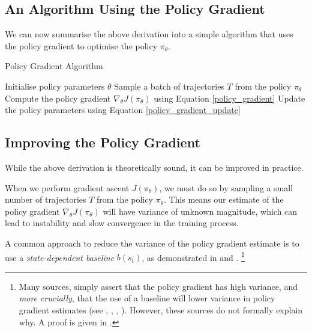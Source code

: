 \documentclass{article} %
\begin{document}
\subsection{An Algorithm Using the Policy Gradient}
We can now summarise the above derivation into a simple algorithm that uses the policy gradient to optimise the policy $\pi_\theta$.
\begin{algorithm}[H]
    \caption{Policy Gradient Algorithm}
    \label{alg:policy_gradient}
    \begin{algorithmic}[1]
        \State Initialise policy parameters $\theta$
            \State Sample a batch of trajectories $T$ from the policy $\pi_\theta$
            \State Compute the policy gradient $\nabla_\theta J(\pi_\theta)$ using Equation \eqref{policy_gradient}
            \State Update the policy parameters using Equation \eqref{policy_gradient_update}
        \EndWhile
    \end{algorithmic}
\end{algorithm}

\subsection{Improving the Policy Gradient}

While the above derivation is theoretically sound, it can be improved in practice.

When we perform gradient ascent $J(\pi_\theta)$, 
we must do so by sampling a small number of trajectories $T$ from the policy $\pi_\theta$.
This means our estimate of the policy gradient $\nabla_\theta J(\pi_\theta)$ will have
variance of unknown magnitude, which can lead to instability and slow convergence in the training process. 


A common approach to reduce the variance of the policy gradient estimate is to use a \textit{state-dependent baseline} $b(s_t)$,
as demonstrated in \cite{SpinningUp-2018} and \cite{Williams-1992}.
\footnote{Many sources, simply assert that the policy gradient has high variance, 
and \textit{more crucially}, that the use of a baseline will lower variance in policy gradient estimates 
(see \cite{Weng-2018}, \cite{SpinningUp-2018}, \cite{Takeshi-2017}, \cite{Sutton-and-Barto-1998}).
However, these sources do not formally explain why. A proof is given in \cite{Wu-et-al-2018}.
}
\end{document}
